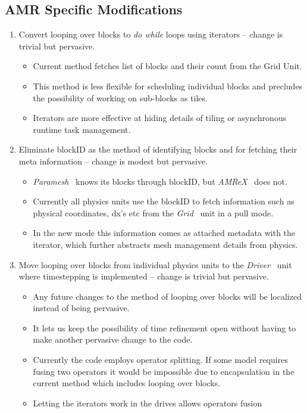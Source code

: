 \documentclass{article}
\newcommand{\amrex}{{\it AMReX}}
\newcommand{\paramesh}{{\it Paramesh}}
\newcommand{\grid}{{\it Grid}}
\newcommand{\driver}{{\it Driver}}
\begin{document}
\subsection{AMR Specific Modifications}
\label{sec:amr}
\begin{enumerate}
\item Convert looping over blocks to {\it do while} loops using
iterators -- change is trivial but pervasive.
\begin{itemize}
\item Current method fetches list of blocks and their count from the Grid Unit.
\item This method is less flexible for scheduling individual blocks
and precludes the possibility of working on sub-blocks as tiles.
\item Iterators are more effective at hiding details of tiling or
asynchronous runtime task management. 
\end{itemize}
\item Eliminate blockID as the method of identifying blocks and for
fetching their meta information -- change is modest but pervasive.
\begin{itemize}
\item \paramesh~ knows its blocks through blockID, but \amrex~ does not.
\item Currently all physics units use the blockID to fetch information
such as physical coordinates, dx's etc from the \grid~ unit in a pull
mode. 
\item In the new mode this information comes as attached metadata with
the iterator, which further abstracts mesh management details from physics.
\end{itemize}
\item Move looping over blocks from individual physics units to the
\driver~ unit where timestepping is implemented -- change is trivial
but pervasive.
\begin{itemize}
\item Any future changes to the method of looping over blocks will be localized instead
of being pervasive.
\item It lets us keep the possibility of time refinement open without
having to make another pervasive change to the code.
\item Currently the code employs operator splitting. If some model
requires fusing two operators it would be impossible due to
encapsulation in the current method which includes looping over blocks.
\item Letting the iterators work in the drives allows operators fusion

\end{itemize}
\end{enumerate}
\end{document}
